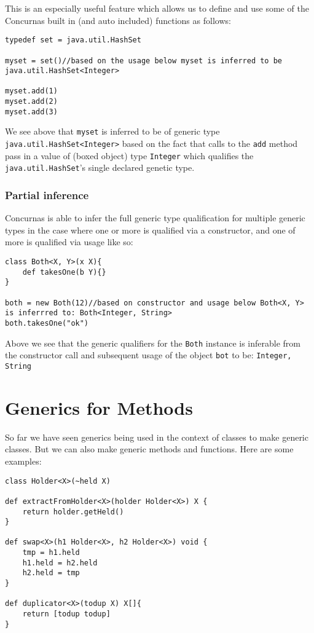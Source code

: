 \documentclass[conc-doc]{subfiles}
\begin{document}
This is an especially useful feature which allows us to define and use some of the Concurnas built in (and auto included) functions as follows:

\begin{lstlisting}
typedef set = java.util.HashSet

myset = set()//based on the usage below myset is inferred to be java.util.HashSet<Integer>

myset.add(1)
myset.add(2)
myset.add(3)
\end{lstlisting}

We see above that \lstinline{myset} is inferred to be of generic type \lstinline{java.util.HashSet<Integer>} based on the fact that calls to the \lstinline{add} method pass in a value of (boxed object) type \lstinline{Integer} which qualifies the \lstinline{java.util.HashSet}'s single declared genetic type.

\subsubsection{Partial inference}
Concurnas is able to infer the full generic type qualification for multiple generic types in the case where one or more is qualified via a constructor, and one of more is qualified via usage like so:

\begin{lstlisting}
class Both<X, Y>(x X){
	def takesOne(b Y){}
}

both = new Both(12)//based on constructor and usage below Both<X, Y> is inferrred to: Both<Integer, String>
both.takesOne("ok")
\end{lstlisting}

Above we see that the generic qualifiers for the \lstinline{Both} instance is inferable from the constructor call and subsequent usage of the object \lstinline{bot} to be: \lstinline{Integer, String}

\section{Generics for Methods}
So far we have seen generics being used in the context of classes to make generic classes. But we can also make generic methods and functions. Here are some examples:

\begin{lstlisting}
class Holder<X>(~held X)

def extractFromHolder<X>(holder Holder<X>) X {
	return holder.getHeld()
}

def swap<X>(h1 Holder<X>, h2 Holder<X>) void {
	tmp = h1.held
	h1.held = h2.held
	h2.held = tmp
}

def duplicator<X>(todup X) X[]{
	return [todup todup]
}
\end{lstlisting}
\end{document}
